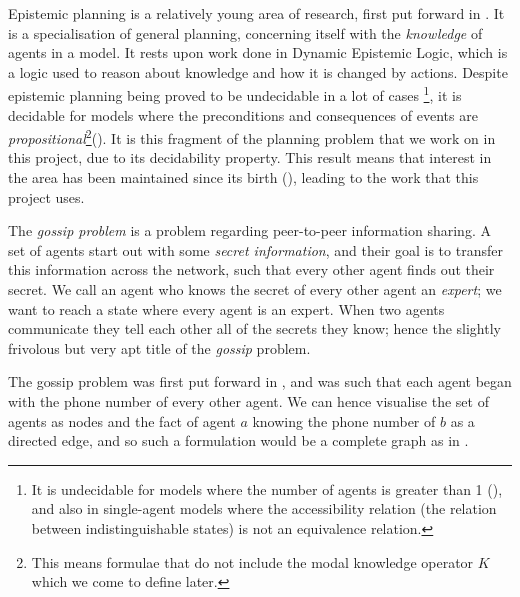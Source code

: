 \documentclass[10pt, a4paper]{report}
\begin{document}
Epistemic planning is a relatively young area of research, first put forward in
\cite{BolanderEP}. It is a specialisation of general planning, concerning itself
with the \emph{knowledge} of agents in a model. It rests upon work done in
Dynamic Epistemic Logic, which is a logic used to reason about knowledge and how
it is changed by actions. Despite epistemic planning being proved to be
undecidable in a lot of cases \footnote{It is undecidable for models where the
  number of agents is greater than 1 (\cite{UndecidabilityEP}), and also in
  single-agent models where the accessibility relation (the relation between
  indistinguishable states) is not an equivalence relation.}, it is decidable
for models where the preconditions and consequences of events are
\emph{propositional}\footnote{This means formulae that do not include the modal
  knowledge operator $K$ which we come to define later.}(\cite{DecidabilityEp}).
It is this fragment of the planning problem that we work on in this project, due
to its decidability property. This result means that interest in the area has
been maintained since its birth (\cite{AutomataTechniques}), leading to the work
that this project uses.

The \emph{gossip problem} is a problem regarding peer-to-peer information sharing. A
set of agents start out with some \emph{secret information}, and their goal is
to transfer this information across the network, such that every other agent
finds out their secret. We call an agent who knows the secret of every other
agent an \emph{expert}; we want to reach a state where every agent is an
expert. When two agents communicate they tell each other all of the secrets they
know; hence the slightly frivolous but very apt title of the \emph{gossip}
problem.

The gossip problem was first put forward in \cite{Tijdeman:1971}, and was such
that each agent began with the phone number of every other agent. We can hence
visualise the set of agents as nodes and the fact of agent $a$ knowing the phone
number of $b$ as a directed edge, and so such a formulation would be a complete
graph as in .
\end{document}
